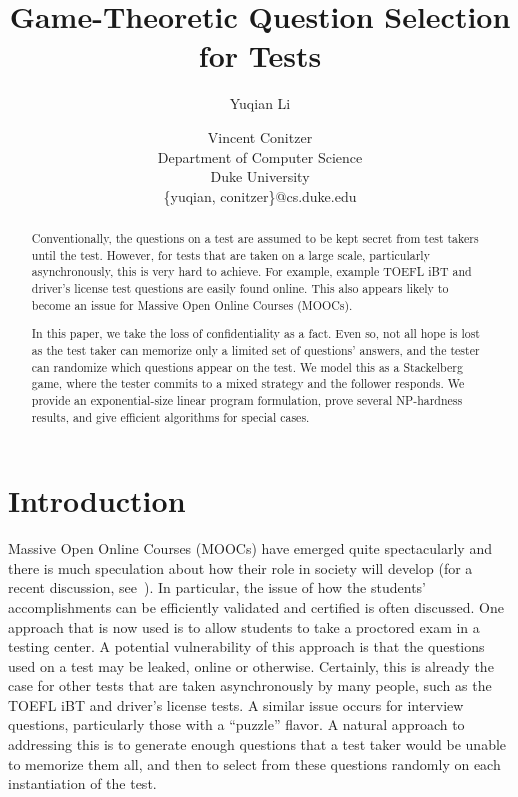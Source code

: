 \documentclass{article}
\title{Game-Theoretic Question Selection for Tests}
\author{Yuqian Li \and Vincent Conitzer\\
Department of Computer Science\\
Duke University\\
\{yuqian, conitzer\}@cs.duke.edu}
\begin{document}
\maketitle

\begin{abstract}
Conventionally, the questions on a test are assumed to be kept secret
from test takers until the test.  However, for tests that are taken on
a large scale, particularly asynchronously, this is very hard to
achieve.  For example, example TOEFL iBT and driver's license test
questions are easily found online.  This also appears likely to become
an issue for Massive Open Online Courses (MOOCs).

In this paper, we take the loss of confidentiality as a fact.  Even
so, not all hope is lost as the test taker can memorize only a limited
set of questions' answers, and the tester can randomize which questions appear on
the test.  We model this as a Stackelberg game, where the tester
commits to a mixed strategy and the follower responds.  We provide an
exponential-size linear program formulation, prove several NP-hardness
results, and give efficient algorithms for special cases.
\end{abstract}

\section{Introduction}
Massive Open Online Courses (MOOCs) have emerged quite spectacularly
and there is much speculation about how their role in society will
develop (for a recent discussion, see~\cite{Cooper13:Reflections}).
In particular, the issue of how the students' accomplishments can be
efficiently validated and certified is often discussed.  One approach
that is now used is to allow students to take a proctored exam in a
testing center.  A potential vulnerability of this approach is that
the questions used on a test may be leaked, online or otherwise.
Certainly, this is already the case for other tests that are taken
asynchronously by many people, such as the TOEFL iBT and driver's
license tests.  A similar issue occurs for interview questions,
particularly those with a ``puzzle'' flavor.  A natural approach to
addressing this is to generate enough questions that a test taker
would be unable to memorize them all, and then to select from these
questions randomly on each instantiation of the test.
\end{document}
